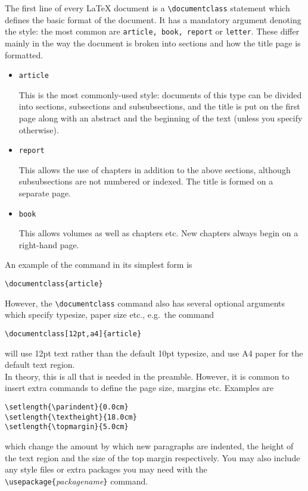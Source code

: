 \documentclass[11pt,a4]{article}
\newcommand{\bi}{\begin{itemize}}
\newcommand{\ei}{\end{itemize}}
\newcommand{\lx}{{\LaTeX} }
\begin{document}
The first line of  every \lx document is a 
\verb+\documentclass+
statement which defines the basic format of
the document. It has a mandatory argument denoting the style: the
most common are \verb+article, book, report+ or \verb+letter+. 
These differ mainly in the way the document is broken into sections and how the title page is formatted.
\bi
\item \begin{verbatim}article\end{verbatim}  This is the most commonly-used style: documents of this type
can be divided into sections, subsections and subsubsections, and the 
title is put on the first page along with an abstract and the beginning
 of the text (unless you specify otherwise).
\item \begin{verbatim}report\end{verbatim}  This allows the use of chapters in addition to the above sections,
 although subsubsections are not numbered or indexed. The title is formed 
on a separate page. 
\item \begin{verbatim}book\end{verbatim}  This allows volumes as well as chapters etc. New chapters 
always begin on a right-hand page.
\ei

An example of the command in its simplest form is
\begin{verbatim} 
\documentclass{article}
\end{verbatim} 
However, the \verb+\documentclass+ command also has several optional arguments
which specify typesize, paper size etc., e.g.\ the command
\begin{verbatim} 
\documentclass[12pt,a4]{article}
\end{verbatim} 
will use 12pt text rather than the default 10pt typesize, and use A4 paper for the 
default text region.\\

In theory, this is all that is needed in the preamble. However, it is common
to insert extra commands to define the page size, margins etc. Examples are
\begin{verbatim} 
\setlength{\parindent}{0.0cm}
\setlength{\textheight}{18.0cm}
\setlength{\topmargin}{5.0cm}
\end{verbatim} 
which change the amount by which new paragraphs are indented, the height of
the text region and the size of the top margin respectively. You
may also include any style files or extra packages you may need
with the \verb+\usepackage{+\textit{packagename}\verb+}+ command.\\
\end{document}
